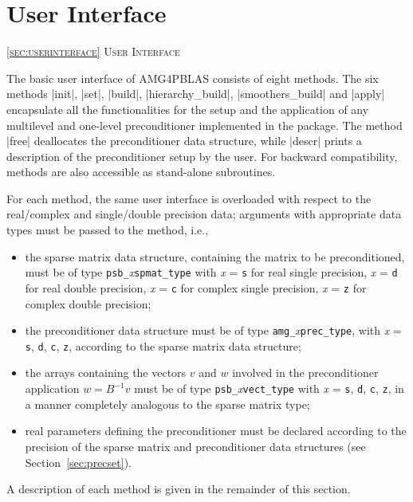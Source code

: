 \section{User Interface\label{sec:userinterface}}
         {\textsc{\ref{sec:userinterface} User Interface}}

The basic user interface of AMG4PBLAS consists of eight methods. The six
methods \fortinline|init|, \fortinline|set|, \fortinline|build|,
\fortinline|hierarchy_build|, \fortinline|smoothers_build| and \fortinline|apply|
encapsulate all the functionalities for the setup and the application
of any multilevel and one-level preconditioner implemented in the
package.
The method \fortinline|free| deallocates the preconditioner data structure, while
\fortinline|descr| prints a description of the preconditioner setup by the user.
For backward compatibility,  methods are also accessible as
stand-alone subroutines.

For each method, the same user interface is overloaded with
respect to the real/complex  and single/double precision data;
arguments with appropriate data types must be passed to the method, i.e.,
\begin{itemize}
\item the sparse matrix data structure, containing the matrix to be
  preconditioned, must be of type \verb|psb_|\emph{x}\verb|spmat_type| 
  with \emph{x} = \verb|s| for real single precision, \emph{x} =
  \verb|d| for real double precision, \emph{x} = \verb|c| for complex
  single precision, \emph{x} = \verb|z| for complex double precision;
\item the preconditioner data structure must be of type
  \verb|amg_|\emph{x}\verb|prec_type|, with \emph{x} =
  \verb|s|, \verb|d|, \verb|c|, \verb|z|, according to the sparse
  matrix data structure;
\item the arrays containing the vectors $v$ and $w$ involved in
  the preconditioner application $w=B^{-1}v$ must be of type
  \verb|psb_|\emph{x}\verb|vect_type| with \emph{x} =
  \verb|s|, \verb|d|, \verb|c|, \verb|z|, in a manner completely
  analogous to the sparse matrix type;
\item real parameters defining the preconditioner must be declared
  according to the precision of the sparse matrix and preconditioner
  data structures (see Section~\ref{sec:precset}).
\end{itemize}
A description of each method is given in the remainder of this section.

